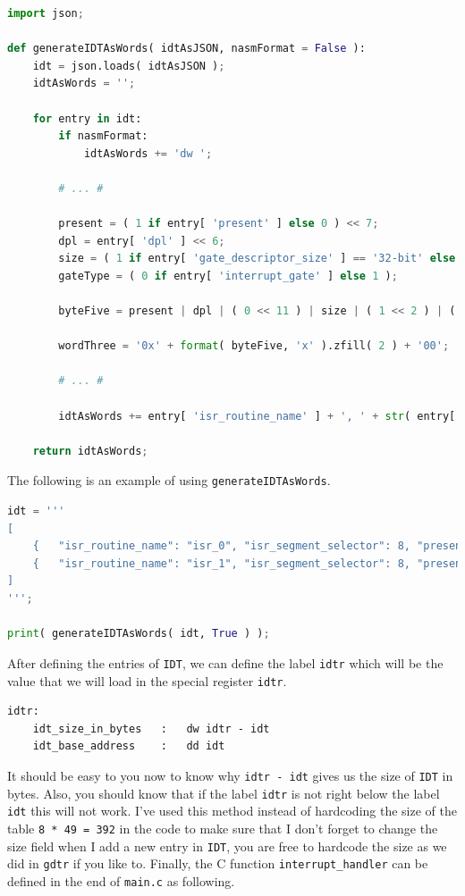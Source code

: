 \begin{lstlisting}[language=Python]
import json;

def generateIDTAsWords( idtAsJSON, nasmFormat = False ):
    idt = json.loads( idtAsJSON );
    idtAsWords = '';
    
    for entry in idt:
        if nasmFormat:
            idtAsWords += 'dw ';
        
        # ... #
        
        present = ( 1 if entry[ 'present' ] else 0 ) << 7;
        dpl = entry[ 'dpl' ] << 6;
        size = ( 1 if entry[ 'gate_descriptor_size' ] == '32-bit' else 0 ) << 3;
        gateType = ( 0 if entry[ 'interrupt_gate' ] else 1 );
        
        byteFive = present | dpl | ( 0 << 11 ) | size | ( 1 << 2 ) | ( 1 << 1 ) | gateType;
        
        wordThree = '0x' + format( byteFive, 'x' ).zfill( 2 ) + '00';
        
        # ... #
        
        idtAsWords += entry[ 'isr_routine_name' ] + ', ' + str( entry[ 'isr_segment_selector' ] ) + ', ' + wordThree + ', 0x0000'  + '\n';
        
    return idtAsWords;
\end{lstlisting}

The following is an example of using \lstinline!generateIDTAsWords!.

\begin{lstlisting}[language=Python]
idt = '''
[
    {   "isr_routine_name": "isr_0", "isr_segment_selector": 8, "present": true, "dpl": 0, "gate_descriptor_size": "32-bit", "interrupt_gate": true },
    {   "isr_routine_name": "isr_1", "isr_segment_selector": 8, "present": true, "dpl": 0, "gate_descriptor_size": "32-bit", "interrupt_gate": true }
]
''';

print( generateIDTAsWords( idt, True ) );
\end{lstlisting}

After defining the entries of \lstinline!IDT!, we can define the label
\lstinline!idtr! which will be the value that we will load in the
special register \lstinline!idtr!.

\begin{lstlisting}
idtr:
    idt_size_in_bytes   :   dw idtr - idt
    idt_base_address    :   dd idt
\end{lstlisting}

It should be easy to you now to know why \lstinline!idtr - idt! gives us
the size of \lstinline!IDT! in bytes. Also, you should know that if the
label \lstinline!idtr! is not right below the label \lstinline!idt! this
will not work. I've used this method instead of hardcoding the size of
the table \lstinline!8 * 49 = 392! in the code to make sure that I don't
forget to change the size field when I add a new entry in
\lstinline!IDT!, you are free to hardcode the size as we did in
\lstinline!gdtr! if you like to. Finally, the C function
\lstinline!interrupt_handler! can be defined in the end of
\lstinline!main.c! as following.

